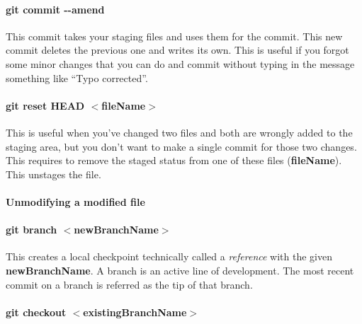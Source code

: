 \documentclass[a4paper, 12pt]{article}
\begin{document}
\paragraph{git commit -{}-amend} This commit takes your staging files and uses them for the commit. This new commit deletes the previous one and writes its own. This is useful if you forgot some minor changes that you can do and commit without typing in the message something like ``Typo corrected''.

\paragraph{git reset HEAD $<$fileName$>$} This is useful when you've changed two files and both are wrongly added to the staging area, but you don't want to make a single commit for those two changes. This requires to remove the staged status from one of these files (\textbf{fileName}). This unstages the file.

\paragraph{Unmodifying a modified file}














\paragraph{git branch $<$newBranchName$>$}
This creates a local checkpoint technically called a \emph{reference} with the given \textbf{newBranchName}. A branch is an active line of development. The most recent commit on a branch is referred as the tip of that branch.

\paragraph{git checkout $<$existingBranchName$>$}
\end{document}
